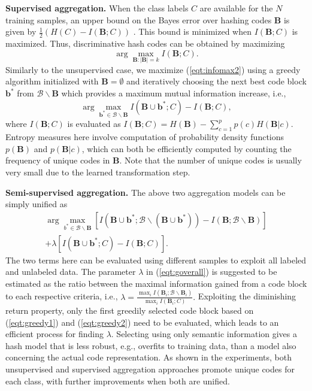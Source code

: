 \documentclass[runningheads]{llncs}
\begin{document}
\textbf{Supervised aggregation.} When the class labels ${C}$ are available for
the $N$ training samples, an upper bound on the Bayes error over hashing codes
$\mathbf{B}$ is given by $\frac{1}{2}(H({C})-I(\mathbf{B}; {C}))$
\cite{Hellman70}.  This bound is minimized when $I(\mathbf{B}; {C})$ is
maximized. Thus, discriminative hash codes can be obtained by maximizing
\begin{equation}
\arg \max_{\mathbf{B}: |\mathbf{B}|=k} I(\mathbf{B}; {C}).
 \label{eqt:infomax2}
\end{equation}
Similarly to the unsupervised case, we maximize (\ref{eqt:infomax2}) using a
greedy algorithm initialized with $\mathbf{B}=\emptyset$ and iteratively
choosing the next best code block $\mathbf{b}^*$ from $\mathcal{B} \backslash
\mathbf{B}$ which provides a maximum mutual information increase, i.e.,
\begin{equation}
\arg \max_{\mathbf{b}^* \in \mathcal{B} \backslash \mathbf{B}} I(\mathbf{B} \cup \mathbf{b}^*; {C}) - I(\mathbf{B}; {C}),
 \label{eqt:greedy2}
\end{equation}
where $I(\mathbf{B}; {C})$ is evaluated as $I(\mathbf{B}; {C}) = H(\mathbf{B}) -
\sum_{c=1}^{p} p(c)H(\mathbf{B} |c).$ Entropy measures here involve computation
of probability density functions $p(\mathbf{B})$ and $p(\mathbf{B}|c)$, which
can both be efficiently computed by counting the frequency of unique codes in
$\mathbf{B}$. Note that the number of unique codes is usually very small due to
the learned transformation step.


\textbf{Semi-supervised aggregation.} The above two aggregation models can be simply unified as
\begin{eqnarray} \nonumber
\arg \max_{b^* \in \mathcal{B} \backslash \mathbf{B}}   [ I(\mathbf{B} \cup \mathbf{b}^*; \mathcal{B}  \backslash (\mathbf{B} \cup \mathbf{b}^*)) - I(\mathbf{B}; \mathcal{B} \backslash \mathbf{B})] \\
 + \lambda [I(\mathbf{B} \cup \mathbf{b}^*; {C}) - I(\mathbf{B}; {C})].
 \label{eqt:goverall}
\end{eqnarray}
The two terms here can be evaluated using different samples to exploit all
labeled and unlabeled data. The parameter $\lambda$ in (\ref{eqt:goverall}) is
suggested to be estimated as the ratio between the maximal information gained
from a code block to each respective criteria, i.e., $\lambda = \frac{\max_i
  I(\mathbf{B}_i;\mathcal{B} \backslash \mathbf{B}_i) }{\max_i I(\mathbf{B}_i;
  C)}.$ Exploiting the diminishing return property, only the first greedily
selected code block based on (\ref{eqt:greedy1}) and (\ref{eqt:greedy2}) need to
be evaluated, which leads to an efficient process for finding $\lambda$.
Selecting using only semantic information gives a hash model that is less
robust, e.g., overfits to training data, than a model also concerning the actual
code representation.  As shown in the experiments, both unsupervised and
supervised aggregation approaches promote unique codes for each class, with
further improvements when both are unified.
\end{document}
